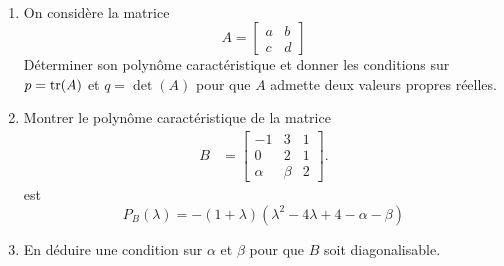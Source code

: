 

\begin{exercise} ~ \label{exam:AlgLin}
  \begin{enumerate}
  \item On considère la matrice 
  $$
  A = \left[\begin{array}{cc} a & b \\ c & d\end{array}\right]
  $$
  Déterminer son polynôme caractéristique et donner les conditions sur $p = \operatorname{tr}(A)$ et $q = \det(A)$ pour que $A$ admette deux valeurs propres réelles.
  \item Montrer le polynôme caractéristique de la matrice 
  \begin{align*}
    B & = \left[\begin{array}{rrr}
      -1 & 3 & 1 \\ 0 & 2 & 1 \\ \alpha & \beta & 2
      \end{array}\right].  
  \end{align*}
  est
  $$
  P_B(\lambda) = -(1+\lambda)(\lambda^2 - 4 \lambda + 4 - \alpha - \beta)
  $$
  \item En déduire une condition sur $\alpha$ et $\beta$ pour que $B$ soit diagonalisable.
  \end{enumerate}
\end{exercise}


